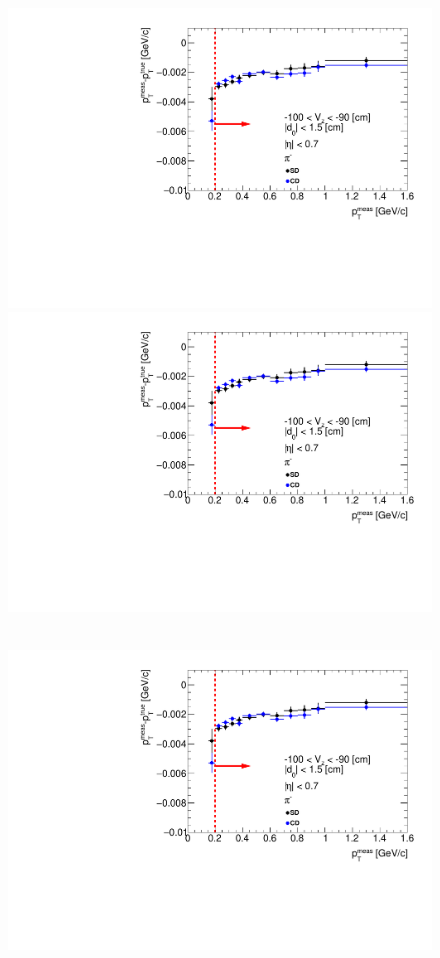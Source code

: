 \begin{figure}[hb]
{  \includegraphics[width=\linewidth,page=29]{graphics/energyLoss/energyLoss3D_OnePrtAlso.pdf}\\
  \includegraphics[width=\linewidth,page=32]{graphics/energyLoss/energyLoss3D_OnePrtAlso.pdf}\\
}~
\parbox{0.329\textwidth}{
  \centering
  \includegraphics[width=\linewidth,page=24]{graphics/energyLoss/energyLoss3D_OnePrtAlso.pdf}\\
}
\end{figure}
